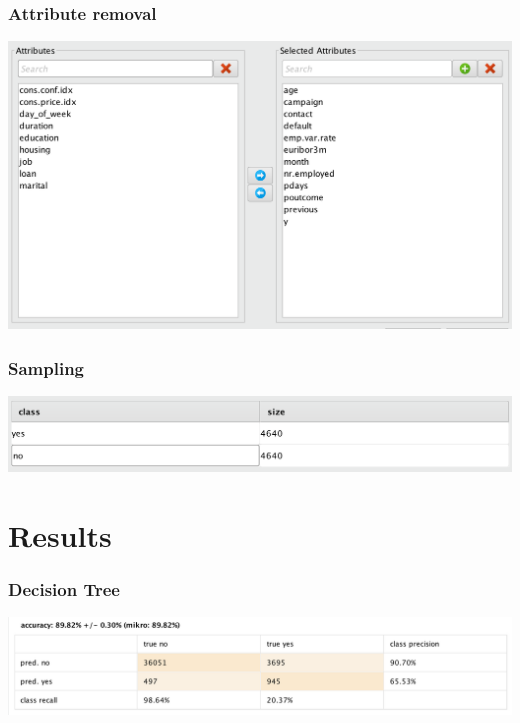 \documentclass{beamer}
\begin{document}
\begin{frame}
	\frametitle{Attribute removal}
  \includegraphics[width=\textwidth,height=\textheight,keepaspectratio]{attributes}
\end{frame}

\begin{frame}
	\frametitle{Sampling}
  \includegraphics[width=\textwidth,height=\textheight,keepaspectratio]{sample}
\end{frame}

\section{Results} %

\begin{frame}
	\frametitle{Decision Tree}
  \includegraphics[width=\textwidth,height=\textheight,keepaspectratio]{dt-aa-nos}
\end{frame}
\end{document}
